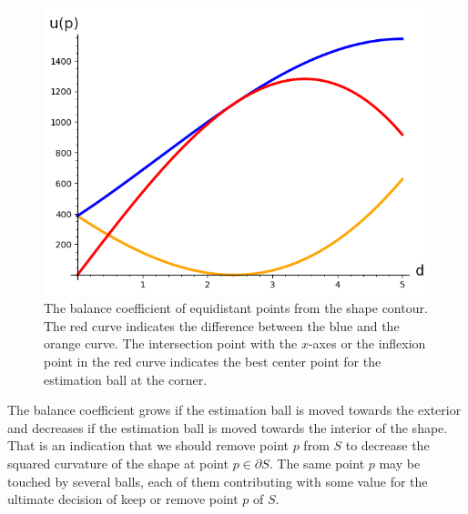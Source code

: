 \begin{figure}
\begin{minipage}{0.25\textwidth}
\end{minipage}%
\begin{minipage}{0.75\textwidth}
\includegraphics[scale=0.75]{figures/chapter7/balance-coefficient-p2-with-sum.png}
\end{minipage}
\caption{The balance coefficient of equidistant points from the shape contour. The red curve indicates the difference between the blue and the orange curve. The intersection point with the $x$-axes or the inflexion point in the red curve indicates the best center point for the estimation ball at the corner. }
\label{fig:balance-plot}
\end{figure}


The balance coefficient grows if the estimation ball is moved towards the exterior and decreases if the estimation ball is moved towards the interior of the shape. That is an indication that we should remove point $p$ from $S$ to decrease the squared curvature of the shape at point $p \in \partial S$. The same point $p$ may be touched by several balls, each of them contributing with some value for the ultimate decision of keep or remove point $p$ of $S$. 


